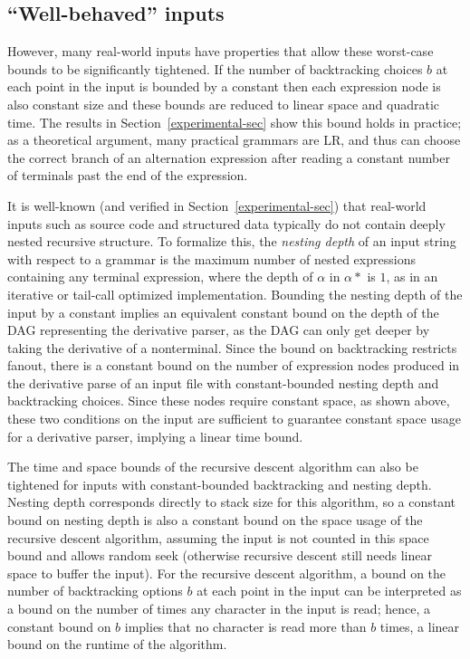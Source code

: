 \documentclass[submission,copyright,creativecommons]{eptcs}
\begin{document}
\subsection{``Well-behaved'' inputs}
\label{well-behaved-sec}
However, many real-world inputs have properties that allow these worst-case bounds to be significantly tightened. 
If the number of backtracking choices $b$ at each point in the input is bounded by a constant then each expression node is also constant size and these bounds are reduced to linear space and quadratic time. 
The results in Section~\ref{experimental-sec} show this bound holds in practice; as a theoretical argument, many practical grammars are LR, and thus can choose the correct branch of an alternation expression after reading a constant number of terminals past the end of the expression.

It is well-known (and verified in Section~\ref{experimental-sec}) that real-world inputs such as source code and structured data typically do not contain deeply nested recursive structure.
To formalize this, the \emph{nesting depth} of an input string with respect to a grammar is the maximum number of nested expressions containing any terminal expression, where the depth of $\alpha$ in $\alpha*$ is $1$, as in an iterative or tail-call optimized implementation. 
Bounding the nesting depth of the input by a constant implies an equivalent constant bound on the depth of the DAG representing the derivative parser, as the DAG can only get deeper by taking the derivative of a nonterminal.
Since the bound on backtracking restricts fanout, there is a constant bound on the number of expression nodes produced in the derivative parse of an input file with constant-bounded nesting depth and backtracking choices.
Since these nodes require constant space, as shown above, these two conditions on the input are sufficient to guarantee constant space usage for a derivative parser, implying a linear time bound.

The time and space bounds of the recursive descent algorithm can also be tightened for inputs with constant-bounded backtracking and nesting depth.
Nesting depth corresponds directly to stack size for this algorithm, so a constant bound on nesting depth is also a constant bound on the space usage of the recursive descent algorithm, assuming the input is not counted in this space bound and allows random seek (otherwise recursive descent still needs linear space to buffer the input). 
For the recursive descent algorithm, a bound on the number of backtracking options $b$ at each point in the input can be interpreted as a bound on the number of times any character in the input is read; hence, a constant bound on $b$ implies that no character is read more than $b$ times, a linear bound on the runtime of the algorithm. 
\end{document}
